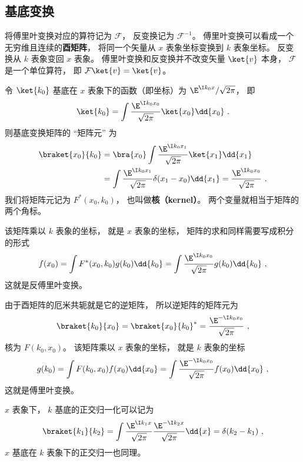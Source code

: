 \subsection{基底变换}

将傅里叶变换对应的算符记为 $\mathcal F$， 反变换记为 $\mathcal F^{-1}$。 傅里叶变换可以看成一个无穷维且连续的\textbf{酉矩阵}， 将同一个矢量从 $x$ 表象坐标变换到 $k$ 表象坐标。 反变换从 $k$ 表象变回 $x$ 表象。 傅里叶变换和反变换并不改变矢量 $\ket{v}$ 本身， $\mathcal F$ 是一个单位算符， 即 $\mathcal F \ket{v} = \ket{v}$。

令 $\ket{k_0}$ 基底在 $x$ 表象下的函数（即坐标）为 $\E^{\I k_0 x}/\sqrt{2\pi }$， 即
\begin{equation}
\ket{k_0} = \int \frac{\E^{\I k_0 x_0}}{\sqrt{2\pi }} \ket{x_0} \dd{x_0}~.
\end{equation}
则基底变换矩阵的 “矩阵元” 为
\begin{equation}
\begin{aligned}
\braket{x_0}{k_0} &= \bra{x_0}\int \frac{\E^{\I k_0 x_1}}{\sqrt{2\pi }} \ket{x_1} \dd{x_1}\\
&= \int \frac{\E^{\I k_0 x_1}}{\sqrt{2\pi }} \delta (x_1 - x_0) \dd{x_1}
= \frac{\E^{\I k_0 x_0}}{\sqrt{2\pi }}~.
\end{aligned}
\end{equation}
我们将矩阵元记为 $F^*(x_0, k_0)$， 也叫做\textbf{核（kernel）}。 两个变量就相当于矩阵的两个角标。

该矩阵乘以 $k$ 表象的坐标， 就是 $x$ 表象的坐标， 矩阵的求和同样需要写成积分的形式
\begin{equation}
f(x_0) = \int F^*(x_0, k_0) g(k_0) \dd{k_0} = \int \frac{\E^{\I k_0 x_0}}{\sqrt{2\pi }} g(k_0) \dd{k_0}~,
\end{equation}
这就是反傅里叶变换。

由于酉矩阵的厄米共轭就是它的逆矩阵， 所以逆矩阵的矩阵元为
\begin{equation}
\braket{k_0}{x_0} = \braket{x_0}{k_0}^* = \frac{\E^{-\I k_0 x_0}}{\sqrt{2\pi }}~,
\end{equation}
核为 $F(k_0, x_0)$。 该矩阵乘以 $x$ 表象的坐标， 就是 $k$ 表象的坐标
\begin{equation}
g(k_0) = \int F(k_0, x_0) f(x_0) \dd{x_0} = \int \frac{\E^{-\I k_0 x_0}}{\sqrt{2\pi }} f(x_0) \dd{x_0}~,
\end{equation}
这就是傅里叶变换。

$x$ 表象下， $k$ 基底的正交归一化可以记为
\begin{equation}\label{eq_FTvec_1}
\braket{k_1}{k_2} = \int \frac{\E^{\I k_1 x}}{\sqrt{2\pi }} \frac{\E^{-\I k_2 x}}{\sqrt{2\pi }} \dd{x} = \delta (k_2 - k_1)~,
\end{equation}
$x$ 基底在 $k$ 表象下的正交归一也同理。

